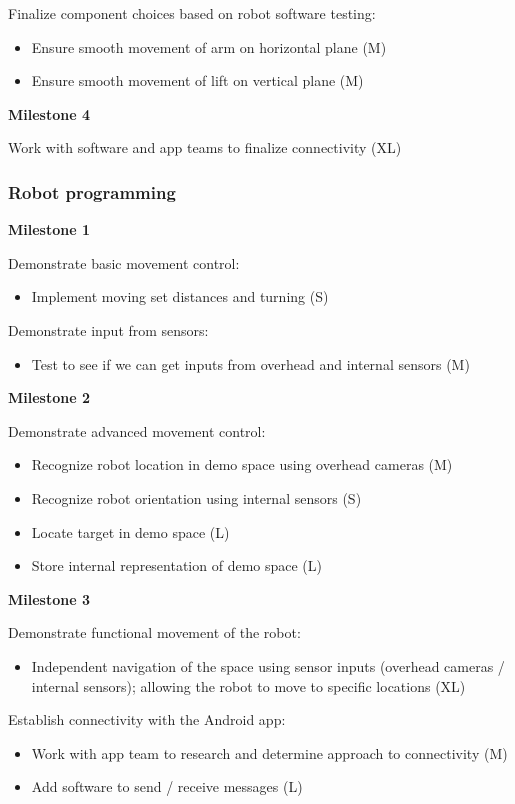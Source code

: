 \documentclass{article}
\begin{document}
Finalize component choices based on robot software testing:
\begin{itemize}
\item Ensure smooth movement of arm on horizontal plane (M)
\item Ensure smooth movement of lift on vertical plane (M)
\end{itemize}


{\bf Milestone 4}

Work with software and app teams to finalize connectivity (XL)


\subsubsection{Robot programming}

{\bf Milestone 1}

Demonstrate basic movement control:
\begin{itemize}
\item Implement moving set distances and turning (S)
\end{itemize}

Demonstrate input from sensors:
\begin{itemize}
\item Test to see if we can get inputs from overhead and internal sensors (M)
\end{itemize}

{\bf Milestone 2}

Demonstrate advanced movement control:
\begin{itemize}
\item Recognize robot location in demo space using overhead cameras (M)
\item Recognize robot orientation using internal sensors (S)
\item Locate target in demo space (L)
\item Store internal representation of demo space (L)
\end{itemize}

{\bf Milestone 3}

Demonstrate functional movement of the robot:
\begin{itemize}
\item Independent navigation of the space using sensor inputs (overhead cameras / internal sensors); allowing the robot to move to specific locations (XL)
\end{itemize}

Establish connectivity with the Android app:
\begin{itemize}
\item Work with app team to research and determine approach to connectivity (M)
\item Add software to send / receive messages (L)
\end{itemize}
\end{document}
